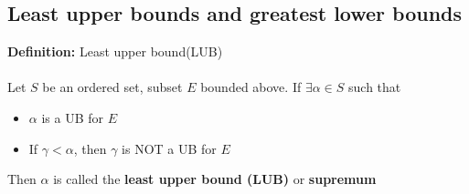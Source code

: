 \documentclass{article}
\begin{document}
\subsection{Least upper bounds and greatest lower bounds}
\begin{definition} 
	\textbf{Definition:} Least upper bound(LUB)\\
~\\
Let $S$ be an ordered set, subset $E$ bounded above. If $\exists\alpha\in S$ such that 
\begin{itemize}
	\item $\alpha$ is a UB for $E$
	\item If $\gamma < \alpha$, then $\gamma$ is NOT a UB for $E$
\end{itemize}
Then $\alpha$ is called the {\color{blue} \textbf{least upper bound (LUB)}} or {\color{blue} \textbf{supremum}}
\end{definition}
\end{document}
